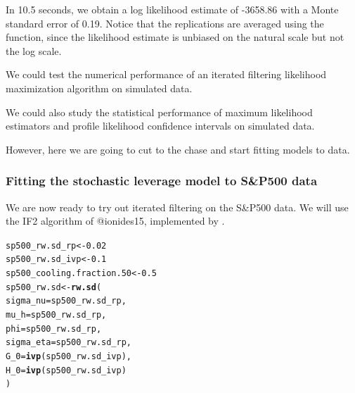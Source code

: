 \documentclass{beamer}\usepackage[]{graphicx}\usepackage[]{color}
\makeatletter
\newcommand{\hlnum}[1]{\textcolor[rgb]{0.686,0.059,0.569}{#1}}%
\newcommand{\hlstd}[1]{\textcolor[rgb]{0.345,0.345,0.345}{#1}}%
\newcommand{\hlkwb}[1]{\textcolor[rgb]{0.69,0.353,0.396}{#1}}%
\newcommand{\hlkwc}[1]{\textcolor[rgb]{0.333,0.667,0.333}{#1}}%
\newcommand{\hlkwd}[1]{\textcolor[rgb]{0.737,0.353,0.396}{\textbf{#1}}}%
\newenvironment{kframe}{%
 \def\at@end@of@kframe{}%
 \ifinner\ifhmode%
  \def\at@end@of@kframe{\end{minipage}}%
  \begin{minipage}{\columnwidth}%
 \fi\fi%
 \def\FrameCommand##1{\hskip\@totalleftmargin \hskip-\fboxsep
 \colorbox{shadecolor}{##1}\hskip-\fboxsep
     \hskip-\linewidth \hskip-\@totalleftmargin \hskip\columnwidth}%
 \MakeFramed {\advance\hsize-\width
   \@totalleftmargin\z@ \linewidth\hsize
   \@setminipage}}%
 {\par\unskip\endMakeFramed%
 \at@end@of@kframe}
\newenvironment{knitrout}{}{} %
\makeatother
\begin{document}
\begin{frame}[fragile]

\bi

\item In  10.5 seconds, we obtain a log likelihood estimate of -3658.86 with a Monte standard error of 0.19. Notice that the replications are averaged using the  function, since the likelihood estimate is unbiased on the natural scale but not the log scale.

\item We could test the numerical performance of an iterated filtering likelihood maximization algorithm on simulated data. 

\item We could also study the statistical performance of maximum likelihood estimators and profile likelihood confidence intervals on simulated data. 

\item However, here we are going to cut to the chase and start fitting models to data. 

\ei

\end{frame}

\begin{frame}[fragile]

\frametitle{Fitting the stochastic leverage model to S\&P500 data}

\bi

\item We are now ready to try out iterated filtering on the S\&P500 data. We will use the IF2 algorithm of @ionides15, implemented by .

\ei

\begin{knitrout}\small
{}\color{fgcolor}\begin{kframe}
\begin{alltt}
\hlstd{sp500_rw.sd_rp} \hlkwb{<-} \hlnum{0.02}
\hlstd{sp500_rw.sd_ivp} \hlkwb{<-} \hlnum{0.1}
\hlstd{sp500_cooling.fraction.50} \hlkwb{<-} \hlnum{0.5}
\hlstd{sp500_rw.sd} \hlkwb{<-} \hlkwd{rw.sd}\hlstd{(}
  \hlkwc{sigma_nu}  \hlstd{= sp500_rw.sd_rp,}
  \hlkwc{mu_h}      \hlstd{= sp500_rw.sd_rp,}
  \hlkwc{phi}       \hlstd{= sp500_rw.sd_rp,}
  \hlkwc{sigma_eta} \hlstd{= sp500_rw.sd_rp,}
  \hlkwc{G_0}       \hlstd{=} \hlkwd{ivp}\hlstd{(sp500_rw.sd_ivp),}
  \hlkwc{H_0}       \hlstd{=} \hlkwd{ivp}\hlstd{(sp500_rw.sd_ivp)}
\hlstd{)}
\end{alltt}
\end{kframe}
\end{knitrout}

\end{frame}
\end{document}
